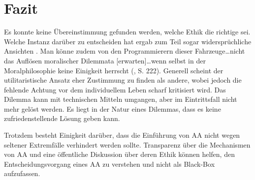\documentclass[a4paper, 12pt, titlepage]{scrartcl}
\begin{document}
\section{Fazit}
	Es konnte keine \"Ubereinstimmung gefunden werden, welche Ethik die \glqq richtige\grqq{} sei. Welche Instanz dar\"uber zu entscheiden hat ergab zum Teil sogar widerspr\"uchliche Ansichten \autocite{Gogoll2016,Hevelke2015}. Man k\"onne zudem von \glqq den Programmierern dieser Fahrzeuge\dots nicht das Auflösen moralischer Dilemmata [erwarten]\dots wenn selbst in der Moralphilosophie keine Einigkeit herrscht\grqq{} (\autocite{Scholz2016}, S. 222). Generell scheint der utilitaristische Ansatz eher Zustimmung zu finden als andere, wobei jedoch die fehlende Achtung vor dem individuellem Leben scharf kritisiert wird. Das Dilemma kann mit technischen Mitteln umgangen, aber im Eintrittsfall nicht mehr gel\"ost werden. Es liegt in der Natur eines Dilemmas, dass es keine zufriedenstellende L\"osung geben kann. 
	
	Trotzdem besteht Einigkeit dar\"uber, dass die Einf\"uhrung von AA nicht wegen seltener Extremf\"alle verhindert werden sollte. Transparenz \"uber die Mechanismen von AA und eine \"offentliche Diskussion \"uber deren Ethik k\"onnen helfen, den Entscheidungsvorgang eines AA zu verstehen und nicht als \glqq Black-Box\grqq{} aufzufassen. 
 


\newpage
\printbibliography
\end{document}

